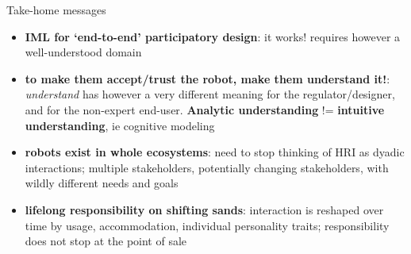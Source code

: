 \documentclass[xcolor=table,aspectratio=169]{beamer}
\begin{document}
\begin{frame}{Take-home messages}
    \begin{itemize}
        \item<+-> \textbf{IML for `end-to-end' participatory design}: it works!
            requires however a well-understood domain

        \item<+-> \textbf{to make them accept/trust the robot, make them understand
            it!}: \emph{understand} has however a very different meaning for the
            regulator/designer, and for the non-expert end-user.
            \textbf{Analytic understanding} != \textbf{intuitive understanding},
            ie cognitive modeling

        \item<+-> \textbf{robots exist in whole ecosystems}: need to stop
            thinking of HRI as dyadic interactions; multiple stakeholders,
            potentially changing stakeholders, with wildly different needs and
            goals

        \item<+-> \textbf{lifelong responsibility on shifting sands}:
            interaction is reshaped over time by usage, accommodation,
            individual personality traits; responsibility does not stop at the
            point of sale
    \end{itemize}
\end{frame}


{
    \begin{frame}[plain]
    \end{frame}
}

\appendix




\end{document}
